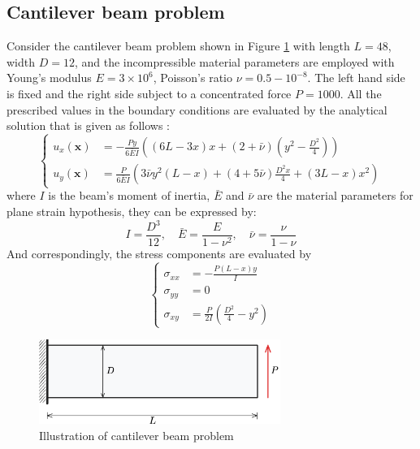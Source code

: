 
\subsection{Cantilever beam problem}\label{sec:cantilever}
Consider the cantilever beam problem shown in Figure \ref{fg:cantilever_model} with length $L = 48$, width $D = 12$, and the incompressible material parameters are employed with Young's modulus $E = 3\times 10^6$, Poisson's ratio $\nu = 0.5-10^{-8}$. The left hand side is fixed and the right side subject to a concentrated force $P = 1000$. All the prescribed values in the boundary conditions are evaluated by the analytical solution that is given as follows \cite{timoshenko1969theory}:
\begin{equation}
\left\{
\begin{aligned}
u_x(\boldsymbol{x}) &= - \frac{Py}{6\bar{E}I} \left( (6L - 3x)x + (2 + \bar{\nu})(y^2 - \frac{D^2}{4}) \right) \\
u_y(\boldsymbol{x}) &= \frac{P}{6\bar{E}I} \left( 3 \bar{\nu} y^2(L-x) + (4+5\bar{\nu}) \frac{D^2x}{4} + (3L-x)x^2 \right)
\end{aligned}
\right.
\end{equation}
where $I$ is the beam's moment of inertia, $\bar{E}$ and $\bar{\nu}$ are the material parameters for plane strain hypothesis, they can be expressed by:
\begin{equation}
I = \frac{D^3}{12}, \quad \bar{E} = \frac{E}{1-\nu^2}, \quad \bar{\nu} = \frac{\nu}{1-\nu}
\end{equation}
And correspondingly, the stress components are evaluated by
\begin{equation}
\left\{
\begin{aligned}
\sigma_{xx} &= - \frac{P(L-x)y}{I} \\
\sigma_{yy} &= 0 \\
\sigma_{xy} &= \frac{P}{2I}(\frac{D^2}{4}-y^2)
\end{aligned}
\right.
\end{equation}

\begin{figure}[H]
\centering
\includegraphics[width=0.7\textwidth]{png/cantilever_model.png}
\caption{Illustration of cantilever beam problem}\label{fg:cantilever_model}
\end{figure}


